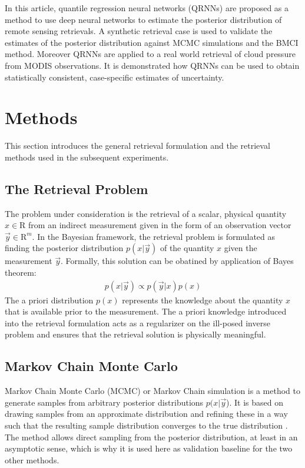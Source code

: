 \documentclass[journal abbreviation, manuscript]{copernicus}
\begin{document}
In this article, quantile regression neural networks (QRNNs) are proposed as a method to use
deep neural networks to estimate the posterior distribution of remote sensing
retrievals. A synthetic retrieval case is used to validate the estimates of the
posterior distribution against MCMC simulations and the BMCI method. Moreover
QRNNs are applied to a real world retrieval of cloud pressure from MODIS
observations. It is demonstrated how QRNNs can be used to obtain statistically
consistent, case-specific estimates of uncertainty.


\section{Methods}

This section introduces the general retrieval formulation and the retrieval methods
used in the subsequent experiments.

\subsection{The Retrieval Problem}

The problem under consideration is the retrieval of a scalar, physical quantity
$x \in \mathrm{R}$ from an indirect measurement given in the form of an observation
vector $\vec{y} \in \mathrm{R}^m$. In the Bayesian framework, the retrieval problem is
formulated as finding the posterior distribution $p(x | \vec{y})$ of the
quantity $x$ given the measurement $\vec{y}$. Formally, this solution can be
obatined by application of Bayes theorem:
\begin{align}
  p(x | \vec{y}) \propto p(\vec{y} | x)p(x)
\end{align}
The a priori distribution $p(x)$ represents the knowledge about the quantity $x$ that
is available prior to the measurement. The a priori knowledge introduced into the
retrieval formulation acts as a regularizer on the ill-posed inverse problem and
ensures that the retrieval solution is physically meaningful.

\subsection{Markov Chain Monte Carlo}

    Markov Chain Monte Carlo (MCMC) or Markov Chain simulation is a method
    to generate samples from arbitrary posterior distributions $p(x | \vec{y}$).
    It is based on drawing samples from an approximate distribution and
    refining these in a way such that the resulting sample distribution
    converges to the true distribution \citep{bda}. The method allows
    direct sampling from the posterior distribution, at least in an
    asymptotic sense, which is why it is used here as validation baseline
    for the two other methods.
\end{document}
